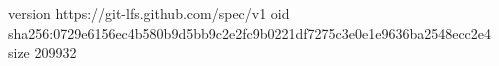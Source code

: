 version https://git-lfs.github.com/spec/v1
oid sha256:0729e6156ec4b580b9d5bb9c2e2fc9b0221df7275c3e0e1e9636ba2548ecc2e4
size 209932
